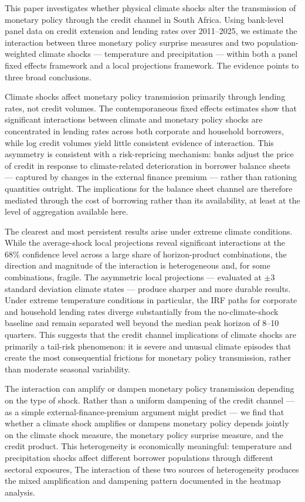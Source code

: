 \documentclass[
  letterpaper,
  DIV=11,
  numbers=noendperiod]{scrartcl}
\begin{document}
This paper investigates whether physical climate shocks alter the
transmission of monetary policy through the credit channel in South
Africa. Using bank-level panel data on credit extension and lending
rates over 2011--2025, we estimate the interaction between three
monetary policy surprise measures and two population-weighted climate
shocks --- temperature and precipitation --- within both a panel fixed
effects framework and a local projections framework. The evidence points
to three broad conclusions.

Climate shocks affect monetary policy transmission primarily through
lending rates, not credit volumes. The contemporaneous fixed effects
estimates show that significant interactions between climate and
monetary policy shocks are concentrated in lending rates across both
corporate and household borrowers, while log credit volumes yield little
consistent evidence of interaction. This asymmetry is consistent with a
risk-repricing mechanism: banks adjust the price of credit in response
to climate-related deterioration in borrower balance sheets --- captured
by changes in the external finance premium --- rather than rationing
quantities outright. The implications for the balance sheet channel are
therefore mediated through the cost of borrowing rather than its
availability, at least at the level of aggregation available here.

The clearest and most persistent results arise under extreme climate
conditions. While the average-shock local projections reveal significant
interactions at the 68\% confidence level across a large share of
horizon-product combinations, the direction and magnitude of the
interaction is heterogeneous and, for some combinations, fragile. The
asymmetric local projections --- evaluated at \(\pm 3\) standard
deviation climate states --- produce sharper and more durable results.
Under extreme temperature conditions in particular, the IRF paths for
corporate and household lending rates diverge substantially from the
no-climate-shock baseline and remain separated well beyond the median
peak horizon of 8--10 quarters. This suggests that the credit channel
implications of climate shocks are primarily a tail-risk phenomenon: it
is severe and unusual climate episodes that create the most
consequential frictions for monetary policy transmission, rather than
moderate seasonal variability.

The interaction can amplify or dampen monetary policy transmission
depending on the type of shock. Rather than a uniform dampening of the
credit channel --- as a simple external-finance-premium argument might
predict --- we find that whether a climate shock amplifies or dampens
monetary policy depends jointly on the climate shock measure, the
monetary policy surprise measure, and the credit product. This
heterogeneity is economically meaningful: temperature and precipitation
shocks affect different borrower populations through different sectoral
exposures, The interaction of these two sources of heterogeneity
produces the mixed amplification and dampening pattern documented in the
heatmap analysis.
\end{document}
